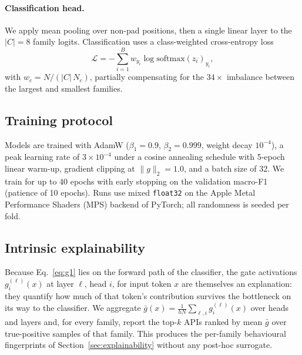\paragraph{Classification head.} We apply mean pooling over
non-pad positions, then a single linear layer to the $|C|=8$
family logits. Classification uses a class-weighted cross-entropy
loss
\begin{equation}
  \mathcal{L} = -\sum_{i=1}^{B} w_{y_i}\log \mathrm{softmax}(z_i)_{y_i},
\end{equation}
with $w_c = N / (|C|\,N_c)$, partially compensating for the
$34\times$ imbalance between the largest and smallest families.

\subsection{Training protocol}
\label{sec:training}

Models are trained with AdamW
($\beta_1{=}0.9$, $\beta_2{=}0.999$, weight decay $10^{-4}$), a peak
learning rate of $3\times 10^{-4}$ under a cosine annealing schedule
with 5-epoch linear warm-up, gradient clipping at $\|g\|_2=1.0$, and
a batch size of 32. We train for up to 40 epochs with early stopping
on the validation macro-F1 (patience of 10 epochs). Runs use mixed
\texttt{float32} on the Apple Metal Performance Shaders (MPS)
backend of PyTorch; all randomness is seeded per fold.

\subsection{Intrinsic explainability}
\label{sec:explain-method}

Because Eq.~\ref{eq:g1} lies on the forward path of the classifier,
the gate activations $g_i^{(\ell)}(x)$ at layer $\ell$, head $i$, for
input token $x$ are themselves an explanation: they quantify how
much of that token's contribution survives the bottleneck on its way
to the classifier. We aggregate
$\bar{g}(x) = \frac{1}{hN}\sum_{\ell,i} g_i^{(\ell)}(x)$
over heads and layers and, for every family, report the top-$k$
APIs ranked by mean $\bar{g}$ over true-positive samples of that
family. This produces the per-family behavioural fingerprints of
Section~\ref{sec:explainability} without any post-hoc surrogate.
